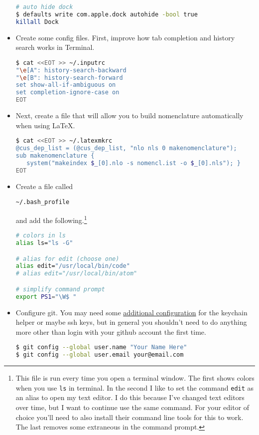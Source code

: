 \begin{itemize}
\begin{lstlisting}[language=bash]
# auto hide dock
$ defaults write com.apple.dock autohide -bool true
killall Dock
\end{lstlisting}


\item Create some config files.  First, improve how tab completion and history search works in Terminal.
\begin{lstlisting}[language=bash]
$ cat <<EOT >> ~/.inputrc
"\e[A": history-search-backward
"\e[B": history-search-forward
set show-all-if-ambiguous on
set completion-ignore-case on
EOT
\end{lstlisting}

\item Next, create a file that will allow you to build nomenclature automatically when using LaTeX.
\begin{lstlisting}[language=bash]
$ cat <<EOT >> ~/.latexmkrc
@cus_dep_list = (@cus_dep_list, "nlo nls 0 makenomenclature");
sub makenomenclature {
   system("makeindex $_[0].nlo -s nomencl.ist -o $_[0].nls"); }
EOT
\end{lstlisting}

\item Create a file called \begin{verbatim}
~/.bash_profile
\end{verbatim}and add the following.\footnote{This file is run every time you open a terminal window.  The first shows colors when you use \texttt{ls} in terminal. In the second I like to set the command \texttt{edit} as an alias to open my text editor.  I do this because I've changed text editors over time, but I want to continue use the same command.  For your editor of choice you'll need to also install their command line tools for this to work.  The last removes some extraneous in the command prompt.}
\begin{lstlisting}[language=bash]
# colors in ls
alias ls="ls -G"

# alias for edit (choose one)
alias edit="/usr/local/bin/code"
# alias edit="/usr/local/bin/atom"

# simplify command prompt
export PS1="\W$ "
\end{lstlisting}


\item Configure git.  You may need some \href{http://burnedpixel.com/blog/setting-up-git-and-github-on-your-mac/#done}{additional configuration} for the keychain helper or maybe ssh keys, but in general you shouldn't need to do anything more other than login with your github account the first time.
\begin{lstlisting}[language=bash]
$ git config --global user.name "Your Name Here"
$ git config --global user.email your@email.com
\end{lstlisting}


\end{itemize}
